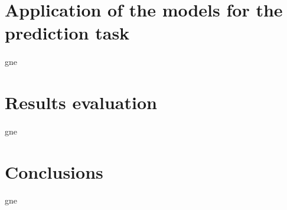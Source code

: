 
\section{Application of the models for the prediction task} \label{sec: step_models_prediction_task}
\paragraph{} gne


\section{Results evaluation} \label{sec: step_restults_evaluation}
\paragraph{} gne


\section{Conclusions} \label{sec: step_conclusions}
\paragraph{} gne
